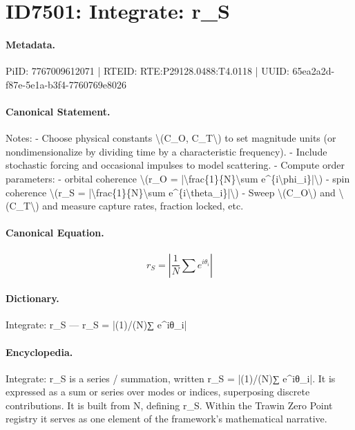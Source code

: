 \section*{ID7501: Integrate: r\_S}
\paragraph{Metadata.}
PiID: 7767009612071 | RTEID: RTE:P29128.0488:T4.0118 | UUID: 65ea2a2d-f87e-5e1a-b3f4-7760769e8026

\paragraph{Canonical Statement.}
Notes: - Choose physical constants \textbackslash{}(C\_O, C\_T\textbackslash{}) to set magnitude units (or nondimensionalize by dividing time by a characteristic frequency). - Include stochastic forcing and occasional impulses to model scattering. - Compute order parameters: - orbital coherence \textbackslash{}(r\_O = |\textbackslash{}frac\{1\}\{N\}\textbackslash{}sum e\textasciicircum{}\{i\textbackslash{}phi\_i\}|\textbackslash{}) - spin coherence \textbackslash{}(r\_S = |\textbackslash{}frac\{1\}\{N\}\textbackslash{}sum e\textasciicircum{}\{i\textbackslash{}theta\_i\}|\textbackslash{}) - Sweep \textbackslash{}(C\_O\textbackslash{}) and \textbackslash{}(C\_T\textbackslash{}) and measure capture rates, fraction locked, etc.

\paragraph{Canonical Equation.}
\[
r_S = |\frac{1}{N}\sum e^{i\theta_i}|
\]

\paragraph{Dictionary.}
Integrate: r\_S — r\_S = |(1)/(N)∑ e\textasciicircum{}iθ\_i|

\paragraph{Encyclopedia.}
Integrate: r\_S is a series / summation, written r\_S = |(1)/(N)∑ e\textasciicircum{}iθ\_i|. It is expressed as a sum or series over modes or indices, superposing discrete contributions. It is built from N, defining r\_S. Within the Trawin Zero Point registry it serves as one element of the framework's mathematical narrative.
